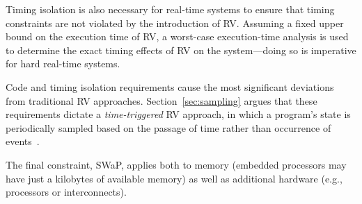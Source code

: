 Timing isolation is also necessary for real-time systems to ensure that timing
constraints are not violated by the introduction of RV.  Assuming a fixed upper
bound on the execution time of RV, a worst-case execution-time analysis is used
to determine the exact timing effects of RV on the system---doing so is
imperative for hard real-time systems.

Code and timing isolation requirements cause the most significant deviations from
traditional RV approaches.  Section~\ref{sec:sampling}  argues 
that these requirements dictate a \emph{time-triggered} RV approach, in which a program's state is
periodically sampled based on the passage of time rather than occurrence of
events~\cite{copilot}.

The final constraint, SWaP, applies both to memory (embedded processors may have
just a kilobytes of available memory) as well as additional hardware (e.g.,
processors or interconnects).










